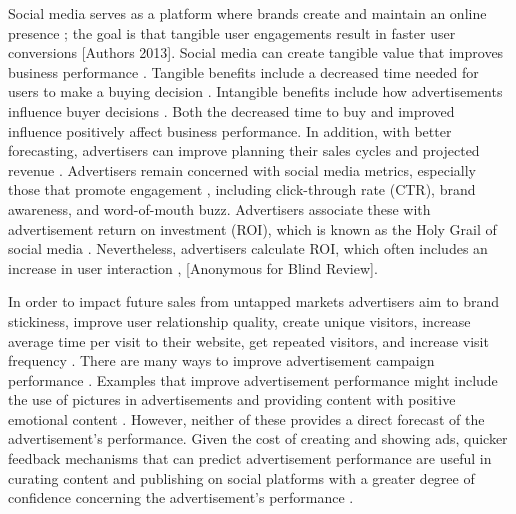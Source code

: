 \documentclass[mksc,blindrev]{informs3} %
\begin{document}
Social media serves as a platform where brands create and maintain an online presence \cite{Greenwood2016}; the goal is that tangible user engagements result in faster user conversions [Authors 2013]. Social media can create tangible value that improves business performance \cite{Barreto2013}. Tangible benefits include a decreased time needed for users to make a buying decision \cite{Barreto2013}. Intangible benefits include how advertisements influence buyer decisions \cite{Barreto2013}. Both the decreased time to buy and improved influence positively affect business performance. In addition, with better forecasting, advertisers can improve planning their sales cycles and projected revenue \cite{Imsa2020}. Advertisers remain concerned with social media metrics, especially those that promote engagement \cite{Tiago2014}, including click-through rate (CTR), brand awareness, and word-of-mouth buzz. Advertisers associate these with advertisement return on investment (ROI), which is known as the Holy Grail of social media \cite{Fisher2009}. Nevertheless, advertisers calculate ROI, which often includes an increase in user interaction \cite{Romero2011}, [Anonymous for Blind Review]. 

In order to impact future sales from untapped markets \cite{Guo2020} advertisers aim to brand stickiness, improve user relationship quality, create unique visitors, increase average time per visit to their website, get repeated visitors, and increase visit frequency \cite{Bhat2002}. There are many ways to improve advertisement campaign performance \cite{Imsa2020}. Examples that improve advertisement performance might include the use of pictures in advertisements \cite{Wagner2015AntecedentsOB} and providing content with positive emotional content \cite{Chen2018}. However, neither of these provides a direct forecast of the advertisement’s performance. Given the cost of creating and showing ads, quicker feedback mechanisms that can predict advertisement performance are useful in curating content and publishing on social platforms with a greater degree of confidence concerning the advertisement’s performance \cite{Hu2016}.
\end{document}
